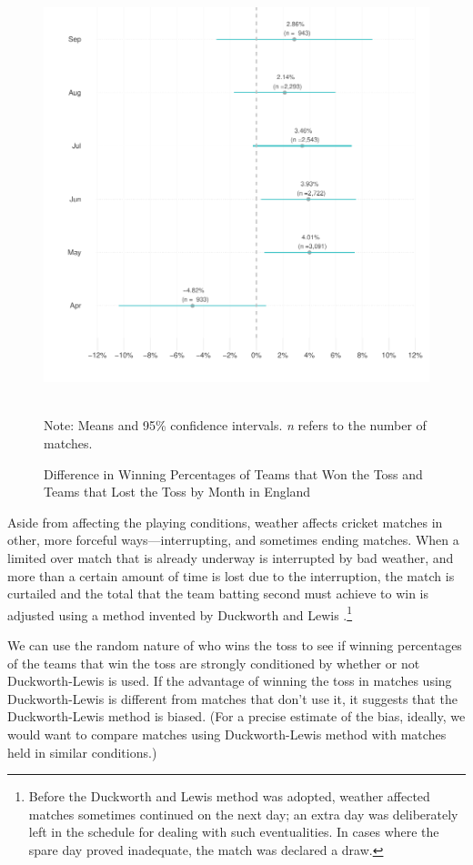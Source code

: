 \documentclass[12pt]{article}
\begin{document}
\begin{figure}[htbp]
\centering
\caption{Difference in Winning Percentages of Teams that Won the Toss and Teams that Lost the Toss by Month in England}
\includegraphics[scale=1]{../figs/winbyMonthEngland.pdf}
{\footnotesize \\ Note: Means and 95\% confidence intervals. \emph{n} refers to the number of matches.\par}
\label{fig:season}
\end{figure}

Aside from affecting the playing conditions, weather affects cricket matches in other, more forceful ways---interrupting, and sometimes ending matches. When a limited over match that is already underway is interrupted by bad weather, and more than a certain amount of time is lost due to the interruption, the match is curtailed and the total that the team batting second must achieve to win is adjusted using a method invented by Duckworth and Lewis \citep[see][]{duckworth1998}.\footnote{Before the Duckworth and Lewis method was adopted, weather affected matches sometimes continued on the next day; an extra day was deliberately left in the schedule for dealing with such eventualities. In cases where the spare day proved inadequate, the match was declared a draw.} 

We can use the random nature of who wins the toss to see if winning percentages of the teams that win the toss are strongly conditioned by whether or not Duckworth-Lewis is used. If the advantage of winning the toss in matches using Duckworth-Lewis is different from matches that don't use it, it suggests that the Duckworth-Lewis method is biased. (For a precise estimate of the bias, ideally, we would want to compare matches using Duckworth-Lewis method with matches held in similar conditions.)
\end{document}
